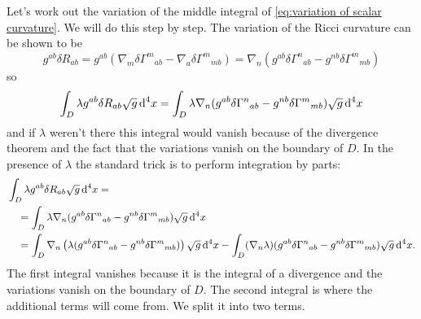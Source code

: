 \documentclass[../main.tex]{subfiles}
\begin{document}
Let's work out the variation of the middle integral of \cref{eq:variation of scalar
curvature}. We will do this step by step. The variation of the Ricci curvature can be shown to be
\begin{equation}\label{eq:variation ricci curvature}
	g^{ab} \delta R_{ab} = g^{ab}(\nabla_m \delta{\Gamma^m}_{ab} - \nabla_a \delta
	{\Gamma^m}_{mb}) = \nabla_n(g^{ab} {\delta\Gamma^n}_{ab} - g^{nb} \delta
	{\Gamma^m}_{mb})
\end{equation}
so
\begin{equation*}
	\int_D \lambda g^{ab}\delta R_{ab} \sqrt{g} \,\mathrm{d}^4 x = \int_D \lambda \nabla_n(g^{ab}
	{\delta\Gamma^n}_{ab} - g^{nb} \delta {\Gamma^m}_{mb}) \sqrt{g} \,\mathrm{d}^4x
\end{equation*}
and if \( \lambda \) weren't there this integral would vanish because of the divergence
theorem and the fact that the variations vanish on the boundary of \( D \). In the
presence of \( \lambda \) the standard trick is to perform integration by parts:
\begin{align*}
	& \int_D \lambda g^{ab}\delta R_{ab} \sqrt{g} \,\mathrm{d}^4 x = \\
	& \quad = \int_D \lambda \nabla_n(g^{ab} {\delta\Gamma^n}_{ab} - g^{nb} \delta
	{\Gamma^m}_{mb}) \sqrt{g} \,\mathrm{d}^4x \\
	& \quad = \int_D \nabla_n \left(\lambda (g^{ab} {\delta\Gamma^n}_{ab} - g^{nb}
	\delta {\Gamma^m}_{mb})\right) \sqrt{g}\,\mathrm{d}^4 x - \int_D (\nabla_n \lambda) (g^{ab}
	{\delta\Gamma^n}_{ab} - g^{nb} \delta {\Gamma^m}_{mb}) \sqrt{g} \,\mathrm{d}^4 x. 
\end{align*}
The first integral vanishes because it is the integral of a divergence and the variations
vanish on the boundary of \( D \). The second integral is where the additional terms will
come from. We split it into two terms. 
\end{document}
